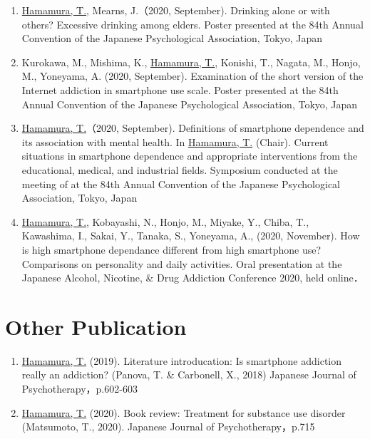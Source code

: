 \documentclass{article}
\begin{document}
\begin{enumerate}
	\item \underline{Hamamura, T.}, Mearns, J.（2020, September). Drinking alone or with others? Excessive drinking among elders. Poster presented at the 84th Annual Convention of the Japanese Psychological Association, Tokyo, Japan
	\item Kurokawa, M., Mishima, K., \underline{Hamamura, T.}, Konishi, T., Nagata, M., Honjo, M., Yoneyama, A. (2020, September). Examination of the short version of the Internet addiction in smartphone use scale. Poster presented at the 84th Annual Convention of the Japanese Psychological Association, Tokyo, Japan
	\item \underline{Hamamura, T.}（2020, September).  Definitions of smartphone dependence and its association with mental health.	In \underline{Hamamura, T.} (Chair). Current situations in smartphone dependence and appropriate interventions from the educational, medical, and industrial fields. Symposium conducted at the meeting of at the 84th Annual Convention of the Japanese Psychological Association, Tokyo, Japan
	\item \underline{Hamamura, T.}, Kobayashi, N., Honjo, M., Miyake, Y., Chiba, T., Kawashima, I., Sakai, Y., Tanaka, S., Yoneyama, A., (2020, November). How is high smartphone dependance different from high smartphone use? Comparisons on personality and daily activities. Oral presentation at the Japanese Alcohol, Nicotine, \& Drug Addiction Conference 2020, held online．
	\end{enumerate}

\section{Other Publication}
	\begin{enumerate}
		\item \underline{Hamamura, T.} (2019). Literature introducation: Is smartphone addiction really an addiction? (Panova, T. \& Carbonell, X., 2018) Japanese Journal of Psychotherapy，p.602-603
		\item \underline{Hamamura, T.} (2020). Book review: Treatment for substance use disorder (Matsumoto, T., 2020). Japanese Journal of Psychotherapy，p.715
	\end{enumerate}
\end{document}
